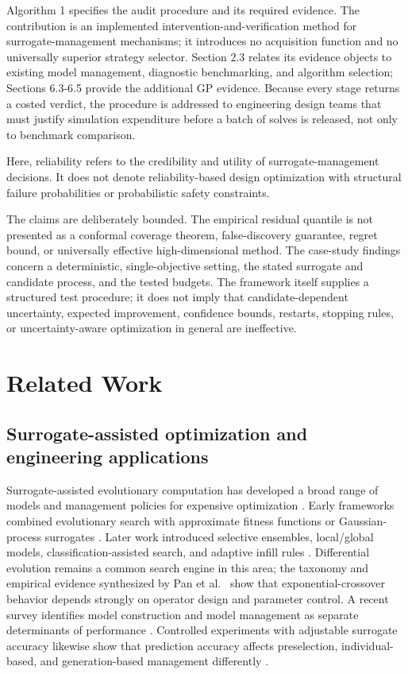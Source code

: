 \documentclass[]{interact}
\begin{document}
Algorithm 1 specifies the audit procedure and its required evidence. The contribution is an implemented intervention-and-verification method for surrogate-management mechanisms; it introduces no acquisition function and no universally superior strategy selector. Section 2.3 relates its evidence objects to existing model management, diagnostic benchmarking, and algorithm selection; Sections 6.3-6.5 provide the additional GP evidence. Because every stage returns a costed verdict, the procedure is addressed to engineering design teams that must justify simulation expenditure before a batch of solves is released, not only to benchmark comparison.

Here, reliability refers to the credibility and utility of surrogate-management decisions. It does not denote reliability-based design optimization with structural failure probabilities or probabilistic safety constraints.

The claims are deliberately bounded. The empirical residual quantile is not presented as a conformal coverage theorem, false-discovery guarantee, regret bound, or universally effective high-dimensional method. The case-study findings concern a deterministic, single-objective setting, the stated surrogate and candidate process, and the tested budgets. The framework itself supplies a structured test procedure; it does not imply that candidate-dependent uncertainty, expected improvement, confidence bounds, restarts, stopping rules, or uncertainty-aware optimization in general are ineffective.

\hypertarget{related-work}{%
\section{Related Work}\label{related-work}}

\hypertarget{surrogate-assisted-optimization-and-engineering-applications}{%
\subsection{Surrogate-assisted optimization and engineering applications}\label{surrogate-assisted-optimization-and-engineering-applications}}

Surrogate-assisted evolutionary computation has developed a broad range of models and management policies for expensive optimization \citep{ref01,ref02}. Early frameworks combined evolutionary search with approximate fitness functions or Gaussian-process surrogates \citep{ref03,ref16}. Later work introduced selective ensembles, local/global models, classification-assisted search, and adaptive infill rules \citep{ref04,ref05,ref17,ref18,ref19}. Differential evolution remains a common search engine in this area; the taxonomy and empirical evidence synthesized by Pan et al.~\citep{ref31} show that exponential-crossover behavior depends strongly on operator design and parameter control. A recent survey identifies model construction and model management as separate determinants of performance \citep{ref02}. Controlled experiments with adjustable surrogate accuracy likewise show that prediction accuracy affects preselection, individual-based, and generation-based management differently \citep{ref20}.
\end{document}
